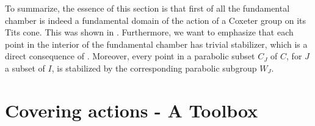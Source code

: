 \begin{figure}[h]
    \centering
    \qquad
\end{figure}

To summarize, the essence of this section is that first of all the fundamental chamber is indeed a fundamental domain of the action of a Coxeter group on its Tits cone.
This was shown in .
Furthermore, we want to emphasize that each point in the interior of the fundamental chamber has trivial stabilizer, which is a direct consequence of .
Moreover, every point in a parabolic subset \(C_J\) of \(C\), for \(J\) a subset of \(I\), is stabilized by the corresponding parabolic subgroup \(W_J\).



\section{Covering actions - A Toolbox}

